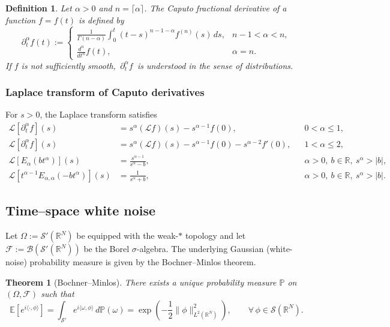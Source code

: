 \documentclass[12pt, reqno]{amsart}
\newcommand{\R}{\ensuremath{\mathbb{R}}}
\newtheorem{definition}{Definition}[section]
\newtheorem{theorem}{Theorem}[section]
\begin{document}
\begin{definition}
Let $\alpha>0$ and $n=\lceil\alpha\rceil$. The Caputo fractional derivative of a function $f=f(t)$
is defined by
\[
\partial_t^\alpha f(t):=
\begin{cases}
\displaystyle\frac{1}{\Gamma(n-\alpha)}\int_0^t (t-s)^{n-1-\alpha} f^{(n)}(s)\,ds,
& n-1<\alpha<n,\\[2mm]
\displaystyle\frac{d^n}{dt^n}f(t),& \alpha=n.
\end{cases}
\]
If $f$ is not sufficiently smooth, $\,\partial_t^\alpha f\,$ is understood in the sense of distributions.
\end{definition}

\subsubsection{Laplace transform of Caputo derivatives}
For $s>0$, the Laplace transform satisfies
\begin{align}
\mathcal{L}\!\left[\partial^\alpha_t f\right](s)
&= s^{\alpha}(\mathcal{L}f)(s) - s^{\alpha-1}f(0),
&& 0<\alpha \leq 1, \label{eq:laplace1}\\
\mathcal{L}\!\left[\partial^\alpha_t f\right](s)
&= s^{\alpha}(\mathcal{L}f)(s) - s^{\alpha-1}f(0)-s^{\alpha-2}f'(0),
&& 1<\alpha \leq 2, \label{eq:laplace11}\\
\mathcal{L}\!\left[E_{\alpha}(b t^{\alpha})\right](s)
&= \frac{s^{\alpha-1}}{s^{\alpha} - b},
&& \alpha>0,\ b\in\R,\ s^\alpha>|b|, \label{eq:laplace2}\\
\mathcal{L}\!\left[t^{\alpha-1} E_{\alpha,\alpha}(-b t^{\alpha})\right](s)
&= \frac{1}{s^{\alpha} + b},
&& \alpha>0,\ b\in\R,\ s^\alpha>|b|. \label{eq:laplace3}
\end{align}

\subsection{Time--space white noise}
Let $\Omega:=\mathcal{S}'(\R^N)$ be equipped with the weak-$\ast$ topology and let
$\mathcal{F}:=\mathcal{B}(\mathcal{S}'(\R^N))$ be the Borel $\sigma$-algebra.
The underlying Gaussian (white-noise) probability measure is given by the Bochner--Minlos theorem.

\begin{theorem}[Bochner--Minlos]
There exists a unique probability measure $\mathbb{P}$ on $(\Omega,\mathcal{F})$ such that
\[
\mathbb{E}\!\left[e^{i\langle\cdot,\phi\rangle}\right]
=\int_{\mathcal{S}'} e^{i\langle\omega,\phi\rangle}\,d\mathbb{P}(\omega)
= \exp\!\left(-\frac12\|\phi\|_{L^2(\R^N)}^2\right),
\qquad \forall\,\phi\in\mathcal{S}(\R^N).
\]
\end{theorem}
\end{document}
